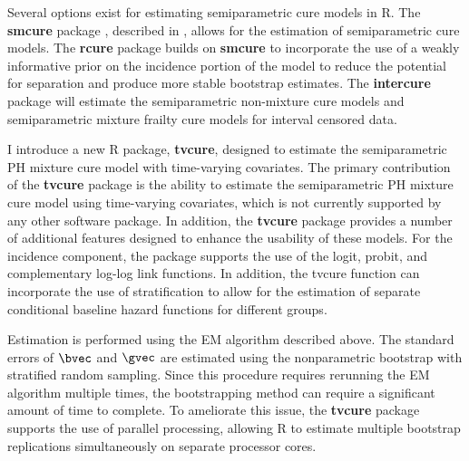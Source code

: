 		Several options exist for estimating semiparametric cure models in R. The \textbf{smcure} package \citep{cai2012a}, described in \citep{cai2012}, allows for the estimation of semiparametric cure models. The \textbf{rcure} package \citep{han2017} builds on \textbf{smcure} to incorporate the use of a weakly informative prior on the incidence portion of the model to reduce the potential for separation and produce more stable bootstrap estimates. The \textbf{intercure} package \citep{brettas2016} will estimate the semiparametric non-mixture cure models and semiparametric mixture frailty cure models for interval censored data. 

I introduce a new R package, \textbf{tvcure}, designed to estimate the semiparametric PH mixture cure model with time-varying covariates. The primary contribution of the \textbf{tvcure} package is the ability to estimate the semiparametric PH mixture cure model using time-varying covariates, which is not currently supported by any other software package. In addition, the \textbf{tvcure} package provides a number of additional features designed to enhance the usability of these models.
	For the incidence component, the package supports the use of the logit, probit, and complementary log-log link functions. %
	In addition, the tvcure function can incorporate the use of stratification to allow for the estimation of separate conditional baseline hazard functions for different groups. 

Estimation is performed using the EM algorithm described above. The standard errors of $\bvec$ and $\gvec$ are estimated using the nonparametric bootstrap with stratified random sampling. 
Since this procedure requires rerunning the EM algorithm multiple times, the bootstrapping method can require a significant amount of time to complete. To ameliorate this issue, the \textbf{tvcure} package supports the use of parallel processing, allowing R to estimate multiple bootstrap replications simultaneously on separate processor cores. 

